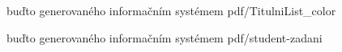 \documentclass[%
	12pt,				%
	a4paper,			%
	twoside,			%
	unicode,			%
]{report}				%
\begin{document}
\pagestyle{empty}			%


 buďto generovaného informačním systémem
	{pdf/TitulniList_color}	%
\oddpage					%

 buďto generovaného informačním systémem
	{pdf/student-zadani}	%
\oddpage					%

\makeabstract

% 

\makecitation

\makedeclaration

\makeacknowledgement

\tableofcontents

\listoffigures

\listoftables

\lstlistoflistings

\cleardoublepage\pagestyle{plain}



% 




\end{document}
